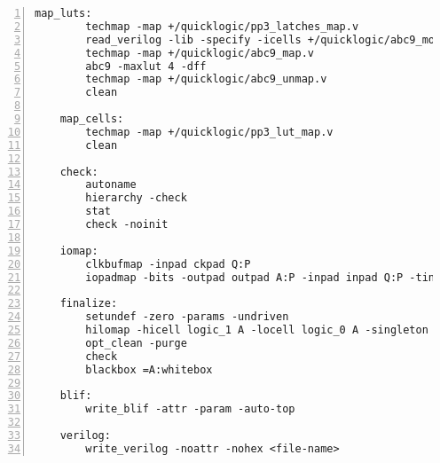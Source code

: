 \begin{lstlisting}[numbers=left,frame=single]
    map_luts:
        techmap -map +/quicklogic/pp3_latches_map.v
        read_verilog -lib -specify -icells +/quicklogic/abc9_model.v
        techmap -map +/quicklogic/abc9_map.v
        abc9 -maxlut 4 -dff
        techmap -map +/quicklogic/abc9_unmap.v
        clean

    map_cells:
        techmap -map +/quicklogic/pp3_lut_map.v
        clean

    check:
        autoname
        hierarchy -check
        stat
        check -noinit

    iomap:
        clkbufmap -inpad ckpad Q:P
        iopadmap -bits -outpad outpad A:P -inpad inpad Q:P -tinoutpad bipad EN:Q:A:P A:top

    finalize:
        setundef -zero -params -undriven
        hilomap -hicell logic_1 A -locell logic_0 A -singleton A:top
        opt_clean -purge
        check
        blackbox =A:whitebox

    blif:
        write_blif -attr -param -auto-top 

    verilog:
        write_verilog -noattr -nohex <file-name>
\end{lstlisting}

